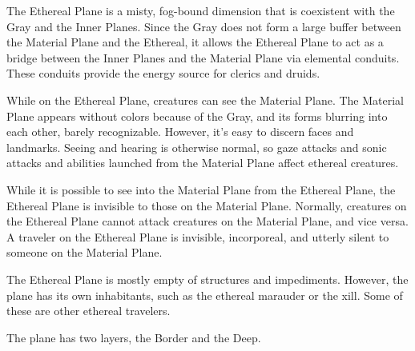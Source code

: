 The Ethereal Plane is a misty, fog-bound dimension that is coexistent with the Gray and the Inner Planes. Since the Gray does not form a large buffer between the Material Plane and the Ethereal, it allows the Ethereal Plane to act as a bridge between the Inner Planes and the Material Plane via elemental conduits. These conduits provide the energy source for clerics and druids.

While on the Ethereal Plane, creatures can see the Material Plane. The Material Plane appears without colors because of the Gray, and its forms blurring into each other, barely recognizable. However, it's easy to discern faces and landmarks. Seeing and hearing is otherwise normal, so gaze attacks and sonic attacks and abilities launched from the Material Plane affect ethereal creatures.

While it is possible to see into the Material Plane from the Ethereal Plane, the Ethereal Plane is invisible to those on the Material Plane. Normally, creatures on the Ethereal Plane cannot attack creatures on the Material Plane, and vice versa. A traveler on the Ethereal Plane is invisible, incorporeal, and utterly silent to someone on the Material Plane.

The Ethereal Plane is mostly empty of structures and impediments. However, the plane has its own inhabitants, such as the ethereal marauder or the xill. Some of these are other ethereal travelers.

The plane has two layers, the Border and the Deep.

